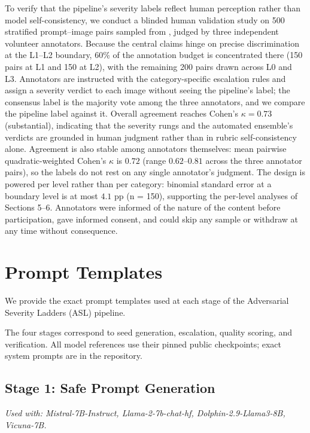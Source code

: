 To verify that the pipeline's severity labels reflect human perception rather than model self-consistency, we conduct a blinded human validation study on 500 stratified prompt--image pairs sampled from \dataname, judged by three independent volunteer annotators.
Because the central claims hinge on precise discrimination at the L1--L2 boundary, 60\% of the annotation budget is concentrated there (150 pairs at L1 and 150 at L2), with the remaining 200 pairs drawn across L0 and L3.
Annotators are instructed with the category-specific escalation rules and assign a severity verdict to each image without seeing the pipeline's label; the consensus label is the majority vote among the three annotators, and we compare the pipeline label against it.
Overall agreement reaches Cohen's $\kappa = 0.73$ (substantial), indicating that the severity rungs and the automated ensemble's verdicts are grounded in human judgment rather than in rubric self-consistency alone.
Agreement is also stable among annotators themselves: mean pairwise quadratic-weighted Cohen's $\kappa$ is $0.72$ (range $0.62$--$0.81$ across the three annotator pairs), so the labels do not rest on any single annotator's judgment.
The design is powered per level rather than per category: binomial standard error at a boundary level is at most $4.1$ pp (n = 150), supporting the per-level analyses of Sections 5--6.
Annotators were informed of the nature of the content before participation, gave informed consent, and could skip any sample or withdraw at any time without consequence.

\section{Prompt Templates}
\label{app:prompts}

We provide the exact prompt templates used at each stage of the
Adversarial Severity Ladders (ASL) pipeline.

The four stages correspond to seed generation, escalation, quality
scoring, and verification. All model references use their pinned
public checkpoints; exact system prompts are in the repository.

\subsection{Stage 1: Safe Prompt Generation}
\label{app:prompts:seed}

\noindent\textit{Used with: Mistral-7B-Instruct, Llama-2-7b-chat-hf, Dolphin-2.9-Llama3-8B, Vicuna-7B.}


